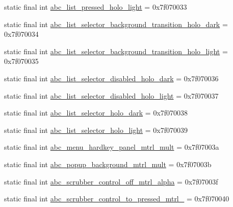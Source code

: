 \begin{DoxyCompactItemize}
static final int \mbox{\hyperlink{classcom_1_1google_1_1android_1_1gms_1_1R_1_1drawable_a7d5c7477c22b6798589d551535279142}{abc\+\_\+list\+\_\+pressed\+\_\+holo\+\_\+light}} = 0x7f070033
\item 
static final int \mbox{\hyperlink{classcom_1_1google_1_1android_1_1gms_1_1R_1_1drawable_a52d04bc870ba051f380fdab9b4b17449}{abc\+\_\+list\+\_\+selector\+\_\+background\+\_\+transition\+\_\+holo\+\_\+dark}} = 0x7f070034
\item 
static final int \mbox{\hyperlink{classcom_1_1google_1_1android_1_1gms_1_1R_1_1drawable_ac5b72966743232f9c8baf68bc4cb9eab}{abc\+\_\+list\+\_\+selector\+\_\+background\+\_\+transition\+\_\+holo\+\_\+light}} = 0x7f070035
\item 
static final int \mbox{\hyperlink{classcom_1_1google_1_1android_1_1gms_1_1R_1_1drawable_a2e2e7bce76809bc4b6b9ed2a5cae540c}{abc\+\_\+list\+\_\+selector\+\_\+disabled\+\_\+holo\+\_\+dark}} = 0x7f070036
\item 
static final int \mbox{\hyperlink{classcom_1_1google_1_1android_1_1gms_1_1R_1_1drawable_a805e9f06711bf4d9e1e1c570e7f5d87a}{abc\+\_\+list\+\_\+selector\+\_\+disabled\+\_\+holo\+\_\+light}} = 0x7f070037
\item 
static final int \mbox{\hyperlink{classcom_1_1google_1_1android_1_1gms_1_1R_1_1drawable_a86ba34c11e57b6ab8dea165aab1082d7}{abc\+\_\+list\+\_\+selector\+\_\+holo\+\_\+dark}} = 0x7f070038
\item 
static final int \mbox{\hyperlink{classcom_1_1google_1_1android_1_1gms_1_1R_1_1drawable_abcb1ac390eb4cceada4a6db8cb89abb9}{abc\+\_\+list\+\_\+selector\+\_\+holo\+\_\+light}} = 0x7f070039
\item 
static final int \mbox{\hyperlink{classcom_1_1google_1_1android_1_1gms_1_1R_1_1drawable_a78129e1364ebfae9d8c00b5430e60e2a}{abc\+\_\+menu\+\_\+hardkey\+\_\+panel\+\_\+mtrl\+\_\+mult}} = 0x7f07003a
\item 
static final int \mbox{\hyperlink{classcom_1_1google_1_1android_1_1gms_1_1R_1_1drawable_af8fc3a8f9c77b308c7e09045ddbc7e72}{abc\+\_\+popup\+\_\+background\+\_\+mtrl\+\_\+mult}} = 0x7f07003b
\item 
static final int \mbox{\hyperlink{classcom_1_1google_1_1android_1_1gms_1_1R_1_1drawable_a21361f6f7e241be8b60f2181de215241}{abc\+\_\+scrubber\+\_\+control\+\_\+off\+\_\+mtrl\+\_\+alpha}} = 0x7f07003f
\item 
static final int \mbox{\hyperlink{classcom_1_1google_1_1android_1_1gms_1_1R_1_1drawable_a0185ff617a2c5f0145559a3d9c74899f}{abc\+\_\+scrubber\+\_\+control\+\_\+to\+\_\+pressed\+\_\+mtrl\+\_}} = 0x7f070040

\end{DoxyCompactItemize}
